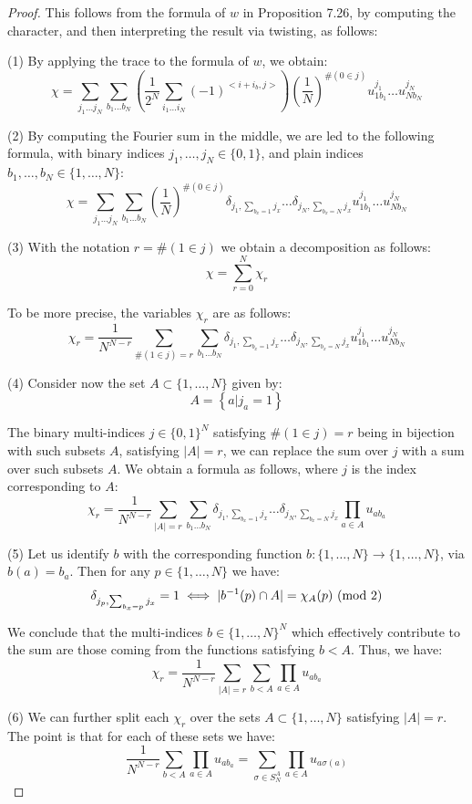 \documentclass[12pt]{amsbook}
\begin{document}
\begin{proof}
This follows from the formula of $w$ in Proposition 7.26, by computing the character, and then interpreting the result via twisting, as follows:

\medskip

(1) By applying the trace to the formula of $w$, we obtain:
$$\chi
=\sum_{j_1\ldots j_N}\sum_{b_1\ldots b_N}\left(\frac{1}{2^N}\sum_{i_1\ldots i_N}(-1)^{<i+i_b,j>}\right)\left(\frac{1}{N}\right)^{\#(0\in j)}u_{1b_1}^{j_1}\ldots u_{Nb_N}^{j_N}$$

(2) By computing the Fourier sum in the middle, we are led to the following formula, with binary indices $j_1,\ldots,j_N\in\{0,1\}$, and plain indices $b_1,\ldots,b_N\in\{1,\ldots,N\}$:
$$\chi=\sum_{j_1\ldots j_N}\sum_{b_1\ldots b_N}\left(\frac{1}{N}\right)^{\#(0\in j)}\delta_{j_1,\sum_{b_x=1}j_x}\ldots\delta_{j_N,\sum_{b_x=N}j_x}u_{1b_1}^{j_1}\ldots u_{Nb_N}^{j_N}$$

(3) With the notation $r=\#(1\in j)$ we obtain a decomposition as follows:
$$\chi=\sum_{r=0}^N\chi_r$$

To be more precise, the variables $\chi_r$ are as follows:
$$\chi_r=\frac{1}{N^{N-r}}\sum_{\#(1\in j)=r}\sum_{b_1\ldots b_N}\delta_{j_1,\sum_{b_x=1}j_x}\ldots\delta_{j_N,\sum_{b_x=N}j_x}u_{1b_1}^{j_1}\ldots u_{Nb_N}^{j_N}$$

(4) Consider now the set $A\subset\{1,\ldots,N\}$ given by:
$$A=\left\{a\Big|j_a=1\right\}$$

The binary multi-indices $j\in\{0,1\}^N$ satisfying $\#(1\in j)=r$ being in bijection with such subsets $A$, satisfying $|A|=r$, we can replace the sum over $j$ with a sum over such subsets $A$. We obtain a formula as follows, where $j$ is the index corresponding to $A$:
$$\chi_r=\frac{1}{N^{N-r}}\sum_{|A|=r}\sum_{b_1\ldots b_N}\delta_{j_1,\sum_{b_x=1}j_x}\ldots\delta_{j_N,\sum_{b_x=N}j_x}\prod_{a\in A}u_{ab_a}$$

(5) Let us identify $b$ with the corresponding function $b:\{1,\ldots,N\}\to\{1,\ldots,N\}$, via $b(a)=b_a$. Then for any $p\in\{1,\ldots,N\}$ we have:
$$\delta_{j_p,\sum_{b_x=p}j_x}=1
\iff |b^{-1}(p)\cap A|=\chi_A(p)\ ({\rm mod}\ 2)$$

We conclude that the multi-indices $b\in\{1,\ldots,N\}^N$ which effectively contribute to the sum are those coming from the functions satisfying $b<A$. Thus, we have:
$$\chi_r=\frac{1}{N^{N-r}}\sum_{|A|=r}\sum_{b<A}\prod_{a\in A}u_{ab_a}$$

(6) We can further split each $\chi_r$ over the sets $A\subset\{1,\ldots,N\}$ satisfying $|A|=r$. The point is that for each of these sets we have:
$$\frac{1}{N^{N-r}}\sum_{b<A}\prod_{a\in A}u_{ab_a}=\sum_{\sigma\in S_N^A}\prod_{a\in A}u_{a\sigma(a)}$$


\end{proof}
\end{document}
